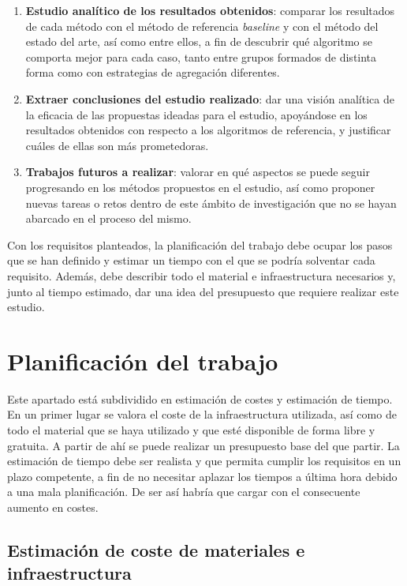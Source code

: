 \begin{enumerate}
	\item{\textbf{Estudio analítico de los resultados obtenidos}: comparar los resultados de cada método con el método de referencia \textit{baseline} y con el método del estado del arte, así como entre ellos, a fin de descubrir qué algoritmo se comporta mejor para cada caso, tanto entre grupos formados de distinta forma como con estrategias de agregación diferentes.}
	\item{\textbf{Extraer conclusiones del estudio realizado}: dar una visión analítica de la eficacia de las propuestas ideadas para el estudio, apoyándose en los resultados obtenidos con respecto a los algoritmos de referencia, y justificar cuáles de ellas son más prometedoras.}
	\item{\textbf{Trabajos futuros a realizar}: valorar en qué aspectos se puede seguir progresando en los métodos propuestos en el estudio, así como proponer nuevas tareas o retos dentro de este ámbito de investigación que no se hayan abarcado en el proceso del mismo.}
\end{enumerate}

Con los requisitos planteados, la planificación del trabajo debe ocupar los pasos que se han definido y estimar un tiempo con el que se podría solventar cada requisito. Además, debe describir todo el material e infraestructura necesarios y, junto al tiempo estimado, dar una idea del presupuesto que requiere realizar este estudio.

\section{Planificación del trabajo}

Este apartado está subdividido en estimación de costes y estimación de tiempo. En un primer lugar se valora el coste de la infraestructura utilizada, así como de todo el material que se haya utilizado y que esté disponible de forma libre y gratuita. A partir de ahí se puede realizar un presupuesto base del que partir. La estimación de tiempo debe ser realista y que permita cumplir los requisitos en un plazo competente, a fin de no necesitar aplazar los tiempos a última hora debido a una mala planificación. De ser así habría que cargar con el consecuente aumento en costes.

\subsection{Estimación de coste de materiales e infraestructura}

